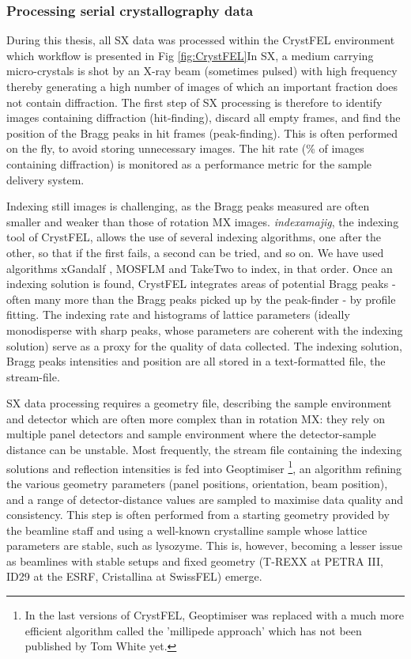 \subsubsection{Processing serial crystallography data}

During this thesis, all SX data was processed within the CrystFEL environment \parencite{whiteCrystFELSoftwareSuite2012} which workflow is presented in Fig \ref{fig:CrystFEL}In SX, a medium carrying micro-crystals is shot by an X-ray beam (sometimes pulsed) with high frequency thereby generating a high number of images of which an important fraction does not contain diffraction. The first step of SX processing is therefore to identify images containing diffraction (hit-finding), discard all empty frames, and find the position of the Bragg peaks in hit frames (peak-finding). This is often performed on the fly, to avoid storing unnecessary images. The hit rate (\% of images containing diffraction) is monitored as a performance metric for the sample delivery system. 

Indexing still images is challenging, as the Bragg peaks measured are often smaller and weaker than those of rotation MX images. \textit{indexamajig}, the indexing tool of CrystFEL, allows the use of several indexing algorithms, one after the other, so that if the first fails, a second can be tried, and so on. We have used algorithms xGandalf \parencite{gevorkovXGANDALFExtendedGradient2019}, MOSFLM \parencite{powellRossmannFourierAutoindexing1999} and TakeTwo \parencite{ginnTakeTwoIndexingAlgorithm2016} to index, in that order. Once an indexing solution is found, CrystFEL integrates areas of potential Bragg peaks - often many more than the Bragg peaks picked up by the peak-finder - by profile fitting. The indexing rate and histograms of lattice parameters (ideally monodisperse with sharp peaks, whose parameters are coherent with the indexing solution) serve as a proxy for the quality of data collected. The indexing solution, Bragg peaks intensities and position are all stored in a text-formatted file, the stream-file. 

SX data processing requires a geometry file, describing the sample environment and detector which are often more complex than in rotation MX: they rely on multiple panel detectors and sample environment where the detector-sample distance can be unstable. Most frequently, the stream file containing the indexing solutions and reflection intensities is fed into Geoptimiser \footnote{In the last versions of CrystFEL, Geoptimiser was replaced with a much more efficient algorithm called the 'millipede approach' which has not been published by Tom White yet. }, an algorithm refining the various geometry parameters (panel positions, orientation, beam position), and a range of detector-distance values are sampled to maximise data quality and consistency. This step is often performed from a starting geometry provided by the beamline staff and using a well-known crystalline sample whose lattice parameters are stable, such as lysozyme. This is, however, becoming a lesser issue as beamlines with stable setups and fixed geometry (T-REXX at PETRA III, ID29 at the ESRF, Cristallina at SwissFEL) emerge.

